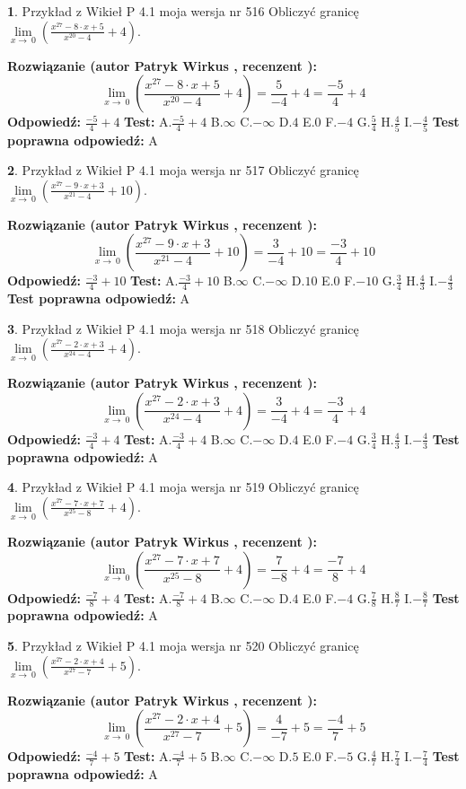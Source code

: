 \documentclass[12pt, a4paper]{article}
\theoremstyle{definition} %
\newtheorem{zad}{}
\newcommand{\zadStart}[1]{\begin{zad}#1\newline}
\newcommand{\zadStop}{\end{zad}}
\newcommand{\rozwStart}[2]{\noindent \textbf{Rozwiązanie (autor #1 , recenzent #2): }\newline}
\newcommand{\rozwStop}{\newline}
\newcommand{\odpStart}{\noindent \textbf{Odpowiedź:}\newline}
\newcommand{\odpStop}{\newline}
\newcommand{\testStart}{\noindent \textbf{Test:}\newline}
\newcommand{\testStop}{\newline}
\newcommand{\kluczStart}{\noindent \textbf{Test poprawna odpowiedź:}\newline}
\newcommand{\kluczStop}{\newline}
\begin{document}
\zadStart{Przykład z Wikieł P 4.1 moja wersja nr 516}
Obliczyć granicę $\lim\limits_{x\to\ 0}(\frac{x^{27}-8 \cdot x +5}{x^{20}-4}+4)$.
\zadStop
\rozwStart{Patryk Wirkus}{}
$$\lim\limits_{x\to\ 0}(\frac{x^{27}-8 \cdot x +5}{x^{20}-4}+4)=\frac{5}{-4}+4=\frac{-5}{4}+4$$
\rozwStop
\odpStart
$\frac{-5}{4}+4$
\odpStop
\testStart
A.$\frac{-5}{4}+4$
B.$\infty$
C.$-\infty$
D.$4$
E.$0$
F.$-4$
G.$\frac{5}{4}$
H.$\frac{4}{5}$
I.$-\frac{4}{5}$
\testStop
\kluczStart
A
\kluczStop



\zadStart{Przykład z Wikieł P 4.1 moja wersja nr 517}
Obliczyć granicę $\lim\limits_{x\to\ 0}(\frac{x^{27}-9 \cdot x +3}{x^{21}-4}+10)$.
\zadStop
\rozwStart{Patryk Wirkus}{}
$$\lim\limits_{x\to\ 0}(\frac{x^{27}-9 \cdot x +3}{x^{21}-4}+10)=\frac{3}{-4}+10=\frac{-3}{4}+10$$
\rozwStop
\odpStart
$\frac{-3}{4}+10$
\odpStop
\testStart
A.$\frac{-3}{4}+10$
B.$\infty$
C.$-\infty$
D.$10$
E.$0$
F.$-10$
G.$\frac{3}{4}$
H.$\frac{4}{3}$
I.$-\frac{4}{3}$
\testStop
\kluczStart
A
\kluczStop



\zadStart{Przykład z Wikieł P 4.1 moja wersja nr 518}
Obliczyć granicę $\lim\limits_{x\to\ 0}(\frac{x^{27}-2 \cdot x +3}{x^{24}-4}+4)$.
\zadStop
\rozwStart{Patryk Wirkus}{}
$$\lim\limits_{x\to\ 0}(\frac{x^{27}-2 \cdot x +3}{x^{24}-4}+4)=\frac{3}{-4}+4=\frac{-3}{4}+4$$
\rozwStop
\odpStart
$\frac{-3}{4}+4$
\odpStop
\testStart
A.$\frac{-3}{4}+4$
B.$\infty$
C.$-\infty$
D.$4$
E.$0$
F.$-4$
G.$\frac{3}{4}$
H.$\frac{4}{3}$
I.$-\frac{4}{3}$
\testStop
\kluczStart
A
\kluczStop



\zadStart{Przykład z Wikieł P 4.1 moja wersja nr 519}
Obliczyć granicę $\lim\limits_{x\to\ 0}(\frac{x^{27}-7 \cdot x +7}{x^{25}-8}+4)$.
\zadStop
\rozwStart{Patryk Wirkus}{}
$$\lim\limits_{x\to\ 0}(\frac{x^{27}-7 \cdot x +7}{x^{25}-8}+4)=\frac{7}{-8}+4=\frac{-7}{8}+4$$
\rozwStop
\odpStart
$\frac{-7}{8}+4$
\odpStop
\testStart
A.$\frac{-7}{8}+4$
B.$\infty$
C.$-\infty$
D.$4$
E.$0$
F.$-4$
G.$\frac{7}{8}$
H.$\frac{8}{7}$
I.$-\frac{8}{7}$
\testStop
\kluczStart
A
\kluczStop



\zadStart{Przykład z Wikieł P 4.1 moja wersja nr 520}
Obliczyć granicę $\lim\limits_{x\to\ 0}(\frac{x^{27}-2 \cdot x +4}{x^{27}-7}+5)$.
\zadStop
\rozwStart{Patryk Wirkus}{}
$$\lim\limits_{x\to\ 0}(\frac{x^{27}-2 \cdot x +4}{x^{27}-7}+5)=\frac{4}{-7}+5=\frac{-4}{7}+5$$
\rozwStop
\odpStart
$\frac{-4}{7}+5$
\odpStop
\testStart
A.$\frac{-4}{7}+5$
B.$\infty$
C.$-\infty$
D.$5$
E.$0$
F.$-5$
G.$\frac{4}{7}$
H.$\frac{7}{4}$
I.$-\frac{7}{4}$
\testStop
\kluczStart
A
\kluczStop
\end{document}
